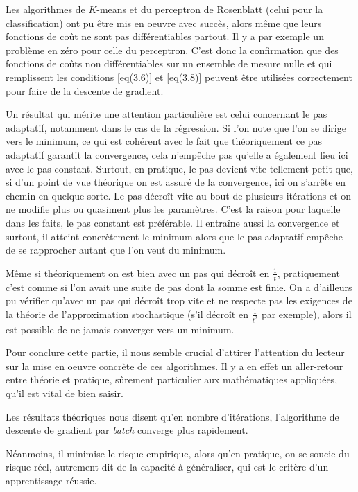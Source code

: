\documentclass{article}
\begin{document}
Les algorithmes de $K$-means et du perceptron de Rosenblatt (celui pour la classification) ont pu être mis en oeuvre avec succès, alors même que leurs fonctions de coût ne sont pas différentiables partout. Il y a par exemple un problème en zéro pour celle du perceptron. C'est donc la confirmation que des fonctions de coûts non différentiables sur un ensemble de mesure nulle et qui remplissent les conditions \eqref{eq(3.6)} et \eqref{eq(3.8)} peuvent être utilisées correctement pour faire de la descente de gradient. 
\bigskip

Un résultat qui mérite une attention particulière est celui concernant le pas adaptatif, notamment dans le cas de la régression. Si l'on note que l'on se dirige vers le minimum, ce qui est cohérent avec le fait que théoriquement ce pas adaptatif  garantit la convergence, cela n'empêche pas qu'elle a également lieu ici avec le pas constant. Surtout, en pratique, le pas devient vite tellement petit que, si d'un point de vue théorique on est assuré de la convergence, ici on s'arrête en chemin en quelque sorte. Le pas décroît vite au bout de plusieurs itérations et on ne modifie plus ou quasiment plus les paramètres. C'est la raison pour laquelle dans les faits, le pas constant est préférable. Il entraîne aussi la convergence et surtout, il atteint concrètement le minimum alors que le pas adaptatif empêche de se rapprocher autant que l'on veut du minimum. 

Même si théoriquement on est bien avec un pas qui décroît en $\frac{1}{t}$, pratiquement c'est comme si l'on avait une suite de pas dont la somme est finie. On a d'ailleurs pu vérifier qu'avec un pas qui décroît trop vite et ne respecte pas les exigences de la théorie de l'approximation stochastique (s'il décroît en $\frac{1}{t^2}$ par exemple), alors il est possible de ne jamais converger vers un minimum.   
\bigskip

Pour conclure cette partie, il nous semble crucial d'attirer l'attention du lecteur sur la mise en oeuvre concrète de ces algorithmes. Il y a en effet un aller-retour entre théorie et pratique, sûrement particulier aux mathématiques appliquées, qu'il est vital de bien saisir. 

Les résultats théoriques nous disent qu'en nombre d'itérations, l'algorithme de descente de gradient par \emph{batch} converge plus rapidement. 

Néanmoins, il minimise le risque empirique, alors qu'en pratique, on se soucie du risque réel, autrement dit de la capacité à généraliser, qui est le critère d'un apprentissage réussie. 
\bigskip
\end{document}
